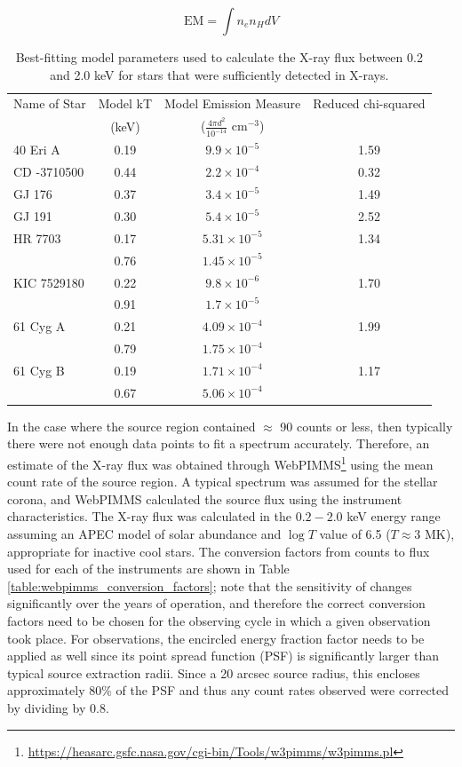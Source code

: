\begin{equation}
    \text{EM} = \int n_{e}n_{H} dV
    \label{Eq:EM_parameter}
\end{equation}


\begin{table}
\centering
\begin{tabular}{l c c c}
	\hline \hline
	Name of Star & Model kT & Model Emission Measure  & Reduced chi-squared\\
    & (keV)          &($\frac{4\pi d^2}{10^{-14}}$ cm$^{-3}$) & \\
	\hline
	40 Eri A & 0.19 & $9.9\times 10^{-5}$ & 1.59\\
	CD -3710500 & 0.44 & $2.2\times 10^{-4}$ & 0.32\\
	GJ 176 & 0.37 & $3.4\times 10^{-5}$ & 1.49\\
	GJ 191 & 0.30 & $5.4\times 10^{-5}$ & 2.52\\
	HR 7703 & 0.17 & $5.31\times 10^{-5}$ & 1.34\\
	& 0.76 & $1.45\times 10^{-5}$  &\\
	KIC 7529180 & 0.22 & $9.8\times 10^{-6}$ & 1.70\\
	& 0.91 & $1.7\times 10^{-5}$  &\\
	61 Cyg A & 0.21 & $4.09\times 10^{-4}$ & 1.99\\
	& 0.79 & $1.75\times 10^{-4}$  &\\
	61 Cyg B & 0.19 & $1.71\times 10^{-4}$ & 1.17\\
	& 0.67 & $5.06\times 10^{-4}$  &\\
	\hline
	\end{tabular}
	\caption[X-ray spectral modelling results]{Best-fitting model parameters used to calculate the X-ray flux between 0.2 and 2.0 keV for stars that were sufficiently detected in X-rays.}
	\label{table:spectral_fit_details}
\end{table}

In the case where the source region contained $\approx$ 90 counts or less, then typically there were not enough data points to fit a spectrum accurately. Therefore, an estimate of the X-ray flux was obtained through WebPIMMS\footnote{\url{https://heasarc.gsfc.nasa.gov/cgi-bin/Tools/w3pimms/w3pimms.pl}} using the mean count rate of the source region. A typical spectrum was assumed for the stellar corona, and WebPIMMS calculated the source flux using the instrument characteristics. The X-ray flux was calculated in the $0.2 - 2.0$ keV energy range assuming an APEC model of solar abundance and $\log T$ value of 6.5 ($T \approx 3$ MK), appropriate for inactive cool stars. The conversion factors from counts to flux used for each of the instruments are shown in Table \ref{table:webpimms_conversion_factors}; note that the sensitivity of \Chandra changes significantly over the years of operation, and therefore the correct conversion factors need to be chosen for the observing cycle in which a given observation took place. For \XMM observations, the encircled energy fraction factor needs to be applied as well since its point spread function (PSF) is significantly larger than typical source extraction radii. Since a 20 arcsec source radius, this encloses approximately 80\% of the PSF and thus any count rates observed were corrected by dividing by $0.8$.

